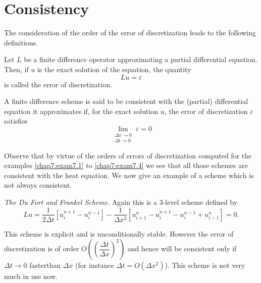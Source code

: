 \section{Consistency}\label{chap7:sec7.3}

The consideration of the order of the error of discretization leads to
the following definitions.

\begin{Definition}\label{chap7:def7.1}
Let $L$ be a finite difference operator approximating a partial
differential equation. Then, if $u$ is the exact solution of the
equation, the quantity
$$
Lu = \varepsilon
$$
is called the error of discretization.
\end{Definition}

\begin{Definition}\label{chap7:def7.2}
A finite difference scheme is said to be consistent with the (partial)
differential equation it approximates if, for the exact solution $u$,
the error of discretization $\varepsilon$ satisfies
\begin{equation*}
\lim\limits_{\substack{\Delta x \to 0\\\Delta t \to 0}}\varepsilon = 0 
\tag{7.12}\label{eq7.12}
\end{equation*}
\end{Definition}

Observe that by virtue of the orders of errors of discretization
computed for the examples \ref{chap7:exam7.1} to \ref{chap7:exam7.4}
we see that all  those schemes are consistent with the heat
equation. We now give an example of a scheme 
which is not always consistent. 

\begin{exam}\label{chap7:exam7.5}
{\em The Du Fort and Frankel Scheme}. Again this is a 3-level scheme
defined by 
\begin{equation*}
Lu = \frac{1}{2 \Delta t} \left[ u^{n+1}_i - u^{n-1}_i\right] -
\frac{1}{\Delta x^2 } \left[ u^n_{i+1} - u^{n+1}_i - u^{n-1}_i +
  u^n_{i-1}\right] = 0.\tag{7.13}\label{eq7.13}
\end{equation*}

This scheme is explicit and is unconditionally stable. However the
error of discretization is of order $O\left(\left(\dfrac{\Delta t}{\Delta
  x}\right)^2\right)$ and hence will be consistent only if $\Delta t \to 0$
faster\pageoriginale than $\Delta x$ (for instance $\Delta t =
O(\Delta x^2)$). This scheme is not very much in use now. 
\end{exam}

